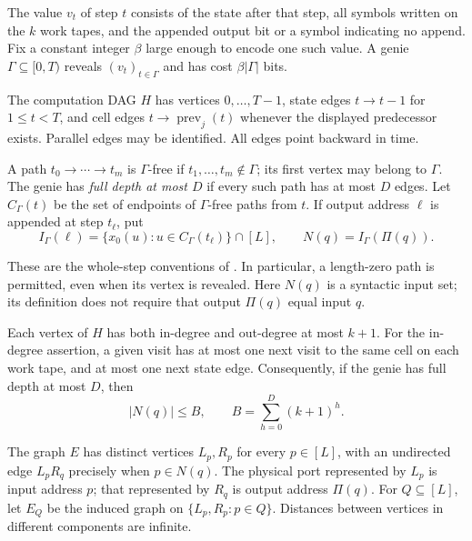 \begin{definition}\label{def:nb-cones}
The value $v_t$ of step $t$ consists of the state after that step, all
symbols written on the $k$ work tapes, and the appended output bit or
a symbol indicating no append.  Fix a constant integer $\beta$ large
enough to encode one such value.  A genie $\Gamma\subseteq[0,T)$
reveals $(v_t)_{t\in\Gamma}$ and has cost $\beta|\Gamma|$ bits.

The computation DAG $H$ has vertices $0,\ldots,T-1$, state edges
$t\to t-1$ for $1\le t<T$, and cell edges
$t\to\operatorname{prev}_j(t)$ whenever the
displayed predecessor exists.  Parallel edges may be identified.  All
edges point backward in time.

A path $t_0\to\cdots\to t_m$ is $\Gamma$-free if
$t_1,\ldots,t_m\notin\Gamma$; its first vertex may belong to $\Gamma$.
The genie has \emph{full depth at most $D$} if every such path has at most
$D$ edges.  Let $C_\Gamma(t)$ be the set of endpoints of $\Gamma$-free
paths from $t$.  If output address $\ell$ is appended at step $t_\ell$,
put
\[
 I_\Gamma(\ell)=\{x_0(u):u\in C_\Gamma(t_\ell)\}\cap[L],
 \qquad N(q)=I_\Gamma(\Pi(q)).
\]
\end{definition}

These are the whole-step conventions of
\cite[the dependency DAG and cone lemma]{BrendeCurved}.  In particular,
a length-zero path is permitted, even when its vertex is revealed.
Here $N(q)$ is a syntactic input set; its definition does not require
that output $\Pi(q)$ equal input $q$.

Each vertex of $H$ has both in-degree and out-degree at most $k+1$.
For the in-degree assertion, a given visit has at most one next visit to
the same cell on each work tape, and at most one next state edge.
Consequently, if the genie has full depth at most $D$, then
\begin{equation}\label{eq:nb-cone-bound}
 |N(q)|\le B,\qquad B=\sum_{h=0}^{D}(k+1)^h.
\end{equation}

\begin{definition}\label{def:nb-incidence}
The graph $E$ has distinct vertices $L_p,R_p$ for every $p\in[L]$, with
an undirected edge $L_pR_q$ precisely when $p\in N(q)$.  The physical
port represented by $L_p$ is input address $p$; that represented by $R_q$
is output address $\Pi(q)$.  For $Q\subseteq[L]$, let $E_Q$ be the
induced graph on $\{L_p,R_p:p\in Q\}$.  Distances between vertices in
different components are infinite.
\end{definition}

